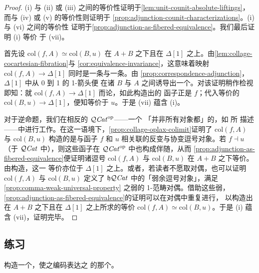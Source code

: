\begin{proof}
(i) 与 (ii) 或 (iii) 之间的等价性证明于\cref{lem:unit-counit-absolute-liftings}，
而与 (iv) 或 (v) 的等价性则证明于
\cref{prop:adjunction-counit-characterizations}。(i) 与 (vi) 之间的等价性
证明于\cref{prop:adjunction-as-fibered-equivalence}。我们最后证明 (i) 等价
于 (vii)。

首先设 $\mathrm{col}(f,A)\simeq\mathrm{col}(B,u)$ 在 $A+B$ 之下且在
$\Delta[1]$ 之上。由\cref{lem:collage-cocartesian-fibration}与
\cref{cor:equivalence-invariance}，这意味着映射 $\mathrm{col}(f,A)\to\Delta[1]$
同时是一条\trCocartesianFibration{}与一条\trCartesianFibration。由
\cref{prop:correspondence-adjunction}，$\Delta[1]$ 中从 0 到 1 的 1-箭头便
在诸\trFiber{} $B$ 与 $A$ 之间诱导出一个\trAdjunction。对该证明稍作检视
即知：就\trBifibration{} $\mathrm{col}(f,A)\to\Delta[1]$ 而论，如此构造出的%
\trLeftAdjoint{}函子正是 $f$；代入等价的\trBifibration
$\mathrm{col}(B,u)\to\Delta[1]$，便知\trRightAdjoint{}等价于 $u$。于是
(vii) 蕴含 (i)。

对于逆命题，我们在相反的\trInfinityCosmos{} $\mathcal{Q}\mathit{Cat}^{\mathrm{op}}$——一个
「并非所有对象都\trCofibrant」的\trInfinityCosmos，如 \cite{bib110} 所
描述——中进行工作。在这一语境下，\cref{prop:collage-oplax-colimit}证明了
$\mathrm{col}(f,A)$ 与 $\mathrm{col}(B,u)$ 构造的是与函子 $f$ 和 $u$
相关联的反变与协变逗号对象。若 $f\dashv u$（于 $\mathcal{Q}\mathit{Cat}$ 中），则这些函子在
$\mathcal{Q}\mathit{Cat}^{\mathrm{op}}$ 中也构成伴随，从而
\cref{prop:adjunction-as-fibered-equivalence}便证明诸逗号
$\mathrm{col}(f,A)$ 与 $\mathrm{col}(B,u)$ 在 $A+B$ 之下等价。由构造，这一
等价亦位于 $\Delta[1]$ 之上。或者，若读者不愿取对偶，也可以证明
$\mathrm{col}(f,A)$ 与 $\mathrm{col}(B,u)$ 定义了\trHomotopyTwoCategory{}
$\mathfrak{h}\mathcal{Q}\mathit{Cat}$ 中的「弱余逗号对象」，满足\cref{prop:comma-weak-universal-property}
之弱\trUniversalProperty{}的 1-范畴对偶。借助这些弱\trUniversalProperty，
\cref{prop:adjunction-as-fibered-equivalence}的证明可以在对偶中重复进行，
以构造出在 $A+B$ 之下且在 $\Delta[1]$ 之上所求的等价
$\mathrm{col}(f,A)\simeq\mathrm{col}(B,u)$。于是 (i) 蕴含 (vii)，证明完毕。
\end{proof}

\subsection*{练习}

\begin{exercise}\label{ex:correspondence-terminal-element}
构造一个\trCorrespondence，使之编码表达\trTerminal{}\trElement{}之\trUniversalProperty{}%
的那个\trAdjunction。
\end{exercise}

